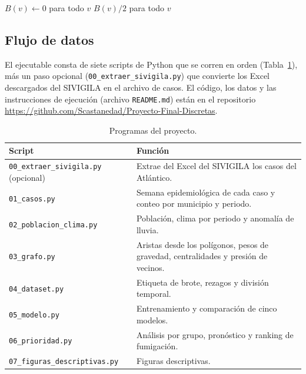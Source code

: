 \documentclass[11pt,letterpaper]{article}
\begin{document}
\begin{algorithm}[H]
\caption{Intermediación de Brandes (grafo no dirigido, sin pesos)}
$B(v)\leftarrow 0$ para todo $v$\;
\Return $B(v)/2$ para todo $v$ 
\end{algorithm}

\subsection{Flujo de datos}
El ejecutable consta de siete scripts de Python que se corren en orden (Tabla~\ref{tab:scripts}), más un paso opcional (\texttt{00\_extraer\_sivigila.py}) que convierte los Excel descargados del SIVIGILA en el archivo de casos. El código, los datos y las instrucciones de ejecución (archivo \texttt{README.md}) están en el repositorio \url{https://github.com/Scastanedad/Proyecto-Final-Discretas}.

\begin{table}[H]
\centering\small
\caption{Programas del proyecto.}
\label{tab:scripts}
\begin{tabularx}{\textwidth}{@{}lX@{}}
\toprule
Script & Función \\
\midrule
\texttt{00\_extraer\_sivigila.py} (opcional) & Extrae del Excel del SIVIGILA los casos del Atlántico. \\
\texttt{01\_casos.py} & Semana epidemiológica de cada caso y conteo por municipio y periodo. \\
\texttt{02\_poblacion\_clima.py} & Población, clima por periodo y anomalía de lluvia. \\
\texttt{03\_grafo.py} & Aristas desde los polígonos, pesos de gravedad, centralidades y presión de vecinos. \\
\texttt{04\_dataset.py} & Etiqueta de brote, rezagos y división temporal. \\
\texttt{05\_modelo.py} & Entrenamiento y comparación de cinco modelos. \\
\texttt{06\_prioridad.py} & Análisis por grupo, pronóstico y ranking de fumigación. \\
\texttt{07\_figuras\_descriptivas.py} & Figuras descriptivas. \\
\bottomrule
\end{tabularx}
\end{table}
\end{document}
